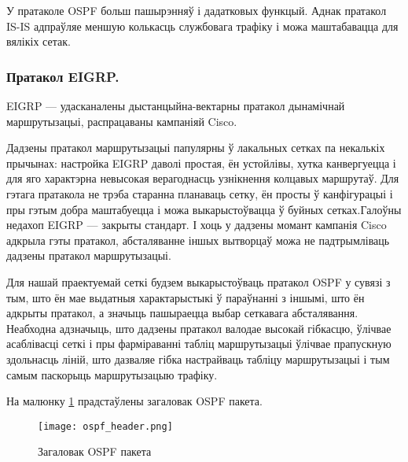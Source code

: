 У пратаколе OSPF больш пашырэнняў і дадатковых функцый. Аднак пратакол IS-IS адпраўляе меншую колькасць службовага трафіку і можа маштабавацца для вялікіх сетак.

\subsubsection{Пратакол EIGRP.}
EIGRP --- удасканалены дыстанцыйна-вектарны пратакол дынамічнай маршрутызацыі, распрацаваны кампаніяй Cisco.

Дадзены пратакол маршрутызацыі папулярны ў лакальных сетках па некалькіх прычынах: настройка EIGRP даволі простая, ён устойлівы, хутка канвергуецца і для яго характэрна невысокая верагоднасць узнікнення колцавых маршрутаў. Для гэтага пратакола не трэба старанна планаваць сетку, ён просты ў канфігурацыі і пры гэтым добра маштабуецца і можа выкарыстоўвацца ў буйных сетках.Галоўны недахоп EIGRP --- закрыты стандарт. І хоць у дадзены момант кампанія Cisco адкрыла гэты пратакол, абсталяванне іншых вытворцаў можа не падтрымліваць дадзены пратакол маршрутызацыі.

Для нашай праектуемай сеткі будзем выкарыстоўваць пратакол OSPF у сувязі
з тым, што ён мае выдатныя характарыстыкі ў параўнанні з іншымі, што ён
адкрыты пратакол, а значыць пашыраецца выбар сеткавага абсталявання.
Неабходна адзначыць, што дадзены пратакол валодае высокай гібкасцю, ўлічвае асаблівасці сеткі і пры фарміраванні табліц маршрутызацыі ўлічвае прапускную здольнасць ліній, што дазваляе гібка настрайваць табліцу маршрутызацыі і тым самым паскорыць маршрутызацыю трафіку.

На малюнку \ref{figure: OSPF Header} прадстаўлены загаловак OSPF пакета.

\begin{figure}[h!]
    \centering
    \texttt{[image: ospf\_header.png]}
    \vspace{-0.7\baselineskip}
    \caption{Загаловак OSPF пакета}
    \label{figure: OSPF Header}
\end{figure}

